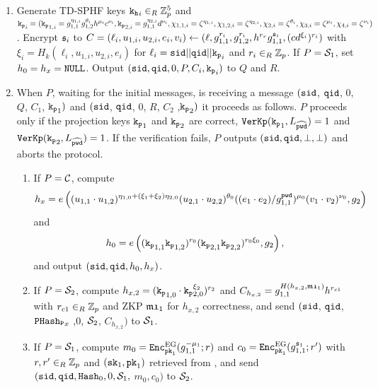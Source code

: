 	
	  \begin{enumerate}
	    \item Generate \ac{TD-SPHF} keys $\mathtt{k_h}_i\in_R\mathbb{Z}_p^{5}$ and 
	      $\mathtt{k_p}_i=(\mathtt{k_p}_{1,i}=g_{1,1}^{\eta_{1,i}} g_{1,2}^{\theta_i} h^{\mu_i} c^{\nu_i}, \mathtt{k_p}_{2,i}=g_{1,1}^{\eta_{2,i}} d^{\nu_i}, \chi_{1,1,i}={\zeta}^{\eta_{1,i}}, \chi_{1,2,i}={\zeta}^{\eta_{2,i}}, \chi_{2,i}={\zeta}^{\theta_i}, \chi_{3,i}={\zeta}^{\mu_i}, \chi_{4,i}={\zeta}^{\nu_i})$. 
	    Encrypt $\mathfrak{s}_i$ to $C=(\ell_i,u_{1,i},u_{2,i},e_i,v_i)\gets(\ell, g_{1,1}^{r_i}, g_{1,2}^{r_i}, h^{r_r} g_{1,1}^{\mathfrak{s}_i}, (cd^{\xi_i})^{r_i})$ with $\xi_i=H_k(\ell_i, u_{1,i}, u_{2,i}, e_i)$ for $\ell_i=\mathtt{sid} || \mathtt{qid} || \mathtt{k_p}_i$ and $r_i\in_R\mathbb{Z}_p$.
	    If $P=\mathcal{S}_1$, set $h_0=h_x=\mathtt{NULL}$.
	    Output $(\mathtt{sid},\mathtt{qid},0,P,C_i,\mathtt{k_p}_i)$ to $Q$ and $R$.
	    
	    \item When $P$, waiting for the initial messages, is receiving a message $(\mathtt{sid}$, $\mathtt{qid}$, $0$, $Q$, $C_1$, $\mathtt{k_p}_1)$ and $(\mathtt{sid}$, $\mathtt{qid}$, $0$, $R$, $C_2$ ,$\mathtt{k_p}_2)$ it proceeds as follows.
	      $P$ proceeds only if the projection keys $\mathtt{k_p}_1$ and $\mathtt{k_p}_2$ are correct, \ie $\mathtt{VerKp}(\mathtt{k_p}_1, L_{\widehat{\mathtt{pwd}}})=1$ and $\mathtt{VerKp}(\mathtt{k_p}_2, L_{\widehat{\mathtt{pwd}}})=1$.
	          If the verification fails, $P$ outputs $(\mathtt{sid}, \mathtt{qid}, \bot, \bot)$ and aborts the protocol.
	      \begin{enumerate}
	        \item If $P=\mathcal{C}$, compute \\
	          \[h_x=e\left((u_{1,1}\cdot u_{1,2})^{\eta_{1,0}+(\xi_1+\xi_2)\eta_{2,0}} (u_{2,1}\cdot u_{2,2})^{\theta_0} ((e_1\cdot e_2)/g_{1,1}^{\mathtt{pwd}})^{\mu_0} (v_1\cdot v_2)^{\nu_0}, g_2\right) \] 
	          and \\
	          \[ h_0=e\left( (\mathtt{k_p}_{1,1}\mathtt{k_p}_{1,2})^{r_0} (\mathtt{k_p}_{2,1}\mathtt{k_p}_{2,2})^{r_0\xi_0}, g_2 \right),\]
	          and output $(\mathtt{sid}, \mathtt{qid}, h_0, h_x)$.
	        \item If $P=\mathcal{S}_2$, compute
	          $h_{x,2} = (\mathtt{k_p}_{1,0} \cdot \mathtt{k_p}_{2,0}^{\xi_2})^{r_2}$ and 
	          $C_{h_{x,2}}=g_{1,1}^{H(h_{x,2}, \mathfrak{m1}_{1})} h^{r_{c1}}$ with $r_{c1}\in_R\mathbb{Z}_p$ and \ac{ZKP} $\mathfrak{m1}_1$ for $h_{x,2}$ correctness,
	          and send $(\mathtt{sid}$, $\mathtt{qid}$, $\mathtt{PHash_P}_x$ ,$0$, $\mathcal{S}_2$, $C_{h_{x,2}})$ to $\mathcal{S}_1$.
	        \item If $P=\mathcal{S}_1$, compute
	          $m_{0} = \mathtt{Enc}_{\mathtt{pk}_1}^\mathrm{EG}(g_{1,1}^{-\mu_1}; r)$ and
	          $c_{0} = \mathtt{Enc}_{\mathtt{pk}_1}^\mathrm{EG}(g_{1,1}^{\mathfrak{s}_1}; r')$
	          with $r,r'\in_R\mathbb{Z}_p$ and $(\mathtt{sk}_1,\mathtt{pk}_1)$ retrieved from \Fca, and send $(\mathtt{sid},\mathtt{qid},\mathtt{Hash}_0,0,\mathcal{S}_1,$ $m_0,c_0)$ to $\mathcal{S}_2$.
	      \end{enumerate}
	      

\end{enumerate}
